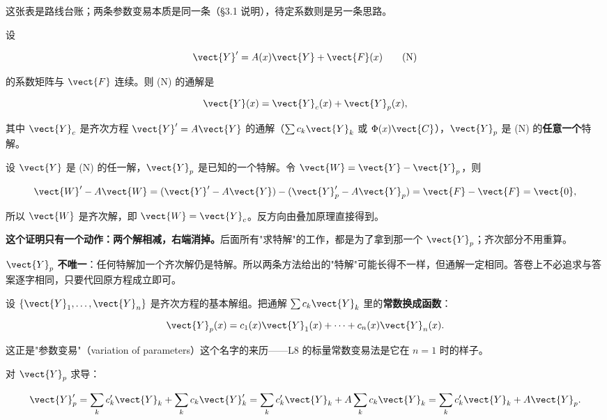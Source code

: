 \documentclass[11pt]{ctexart}
\begin{document}
这张表是路线台账；两条参数变易本质是同一条（§3.1 说明），待定系数则是另一条思路。



设

\[
\vect{Y}'=A(x)\vect{Y}+\vect{F}(x)\tag{N}
\]

的系数矩阵与 $\vect{F}$ 连续。则 (N) 的通解是

\[
\vect{Y}(x)=\vect{Y}_c(x)+\vect{Y}_p(x),
\]

其中 $\vect{Y}_c$ 是齐次方程 $\vect{Y}'=A\vect{Y}$ 的通解（$\sum c_k\vect{Y}_k$ 或 $\Phi(x)\vect{C}$），$\vect{Y}_p$ 是 (N) 的\textbf{任意一个}特解。


设 $\vect{Y}$ 是 (N) 的任一解，$\vect{Y}_p$ 是已知的一个特解。令 $\vect{W}=\vect{Y}-\vect{Y}_p$，则

\[
\vect{W}'-A\vect{W}=(\vect{Y}'-A\vect{Y})-(\vect{Y}_p'-A\vect{Y}_p)=\vect{F}-\vect{F}=\vect{0},
\]

所以 $\vect{W}$ 是齐次解，即 $\vect{W}=\vect{Y}_c$。反方向由叠加原理直接得到。

\textbf{这个证明只有一个动作：两个解相减，右端消掉。}后面所有"求特解"的工作，都是为了拿到那一个 $\vect{Y}_p$；齐次部分不用重算。


$\vect{Y}_p$ \textbf{不唯一}：任何特解加一个齐次解仍是特解。所以两条方法给出的"特解"可能长得不一样，但通解一定相同。答卷上不必追求与答案逐字相同，只要代回原方程成立即可。



设 $\{\vect{Y}_1,\dots,\vect{Y}_n\}$ 是齐次方程的基本解组。把通解 $\sum c_k\vect{Y}_k$ 里的\textbf{常数换成函数}：

\[
\vect{Y}_p(x)=c_1(x)\vect{Y}_1(x)+\cdots+c_n(x)\vect{Y}_n(x).
\]

这正是"参数变易"（variation of parameters）这个名字的来历——L8 的标量常数变易法是它在 $n=1$ 时的样子。


对 $\vect{Y}_p$ 求导：

\[
\vect{Y}_p'=\sum_k c_k'\vect{Y}_k+\sum_k c_k\vect{Y}_k'
=\sum_k c_k'\vect{Y}_k+A\sum_k c_k\vect{Y}_k
=\sum_k c_k'\vect{Y}_k+A\vect{Y}_p .
\]
\end{document}
